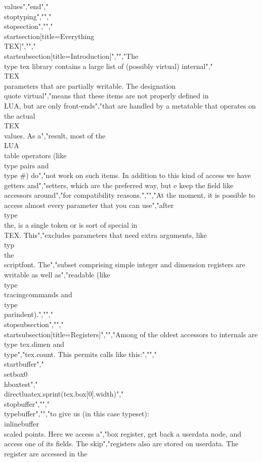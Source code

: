 values","end","\\stoptyping","","\\stopsection","","\\startsection[title={Everything \\TEX}]","","\\startsubsection[title={Introduction}]","","The \\type {tex} library contains a large list of (possibly virtual) internal","\\TEX\\ parameters that are partially writable. The designation \\quote {virtual}","means that these items are not properly defined in \\LUA, but are only front-ends","that are handled by a metatable that operates on the actual \\TEX\\ values. As a","result, most of the \\LUA\\ table operators (like \\type {pairs} and \\type {#}) do","not work on such items. In addition to this kind of access we have getters and","setters, which are the preferred way, but e keep the field like accessors around","for compatibility reasons.","","At the moment, it is possible to access almost every parameter that you can use","after \\type {\\the}, is a single token or is sort of special in \\TEX. This","excludes parameters that need extra arguments, like \\typ {\\the \\scriptfont}. The","subset comprising simple integer and dimension registers are writable as well as","readable (like \\type {\\tracingcommands} and \\type {\\parindent}).","","\\stopsubsection","","\\startsubsection[title=Registers]","","Among of the oldest accessors to internals are \\type {tex.dimen} and \\type","{tex.count}. This permits calls like this:","","\\startbuffer","\\setbox0\\hbox{test}","\\directlua{tex.sprint(tex.box[0].width)}","\\stopbuffer","","\\typebuffer","","to give us (in this case typeset): \\inlinebuffer\\ scaled points. Here we access a","box register, get back a userdata node, and access one of its fields. The skip","registers also are stored on userdata. The register are accessed in the 